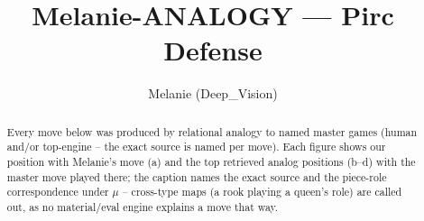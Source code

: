 \documentclass[11pt]{article}
\title{Melanie-ANALOGY — Pirc Defense}
\author{Melanie (Deep\_Vision)}
\date{}
\begin{document}
\maketitle

\begin{abstract}Every move below was produced by relational analogy to named master games (human and/or top-engine -- the exact source is named per move). Each figure shows our position with Melanie's move (a) and the top retrieved analog positions (b--d) with the master move played there; the caption names the exact source and the piece-role correspondence under $\mu$ -- cross-type maps (a rook playing a queen's role) are called out, as no material/eval engine explains a move that way.\end{abstract}

\begin{figure}[p]\centering
\begin{subfigure}{0.46\textwidth}\centering
\resizebox{\linewidth}{!}{%
\newchessgame
\chessboard[
  setfen={rnbq1rk1/pp2ppbp/2pp1np1/8/3PP2P/2N2N2/PPP1BPP1/R1BQ1RK1 b - - 0 7},
  showmover=false,
  pgfstyle=straightmove, color=movearrow, markmove={e7-e5}
]}
\caption{}
\end{subfigure}\hfill
\begin{subfigure}{0.46\textwidth}\centering
\resizebox{\linewidth}{!}{%
\newchessgame
\chessboard[
  setfen={rnbq1rk1/1pp1ppb1/p2p1np1/7p/2PPP3/2N3N1/PP2BPPP/R1BQ1RK1 b - - 1 8},
  showmover=false,
  pgfstyle=straightmove, color=movearrow, markmove={c7-c5}
]}
\caption{}
\end{subfigure}
\\[4pt]
\begin{subfigure}{0.46\textwidth}\centering
\resizebox{\linewidth}{!}{%
\newchessgame
\chessboard[
  setfen={rnbq1rk1/1pp1ppb1/p2p1np1/7p/2PPP3/2N3N1/PP2BPPP/R1BQ1RK1 b - - 1 8},
  showmover=false,
  pgfstyle=straightmove, color=movearrow, markmove={c7-c5}
]}
\caption{}
\end{subfigure}\hfill
\begin{subfigure}{0.46\textwidth}\centering
\resizebox{\linewidth}{!}{%
\newchessgame
\chessboard[
  setfen={r1bq1rk1/ppp1ppbp/n2p1np1/8/2PPP3/2N2N2/PP2BPPP/R1BQ1RK1 b - - 5 7},
  showmover=false,
  pgfstyle=straightmove, color=movearrow, markmove={e7-e5}
]}
\caption{}
\end{subfigure}

\end{figure}
\end{document}
